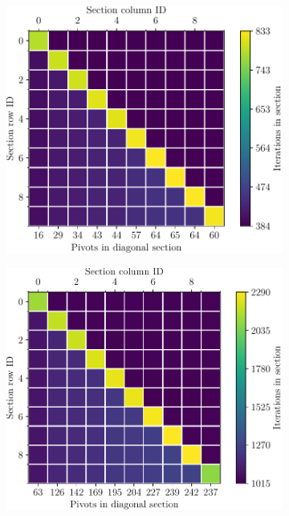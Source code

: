 \begin{figure}[ht!]
	\centering
	\begin{subfigure}[t]{0.48\textwidth}
		\centering
		\includegraphics[width=\textwidth, keepaspectratio]{images/ch03/input-matrices/decomposition-benchmarks/Cejka3839_icmxpp_metrics.pdf}
		\label{Figure:comparing-decomposers-and-solvers->decomposition-project-benchmarks->decomposers-benchmark->comparison-of-execution-times-on-subset-of-matrices->ICMxPP-metrics->Cejka3839}
	\end{subfigure}\hspace{0.03\textwidth}
	\begin{subfigure}[t]{0.48\textwidth}
		\centering
		\includegraphics[width=\textwidth, keepaspectratio, clip]{images/ch03/input-matrices/decomposition-benchmarks/Cejka10135_icmxpp_metrics.pdf}

\end{subfigure}
\end{figure}
